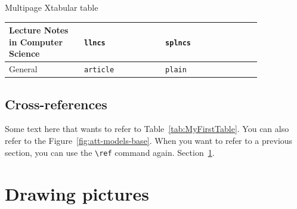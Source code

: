 \documentclass{beamer}
\begin{document}
\begin{frame}{Multipage Xtabular table}
\begin{table}
\begin{xtabular}{
			p{0.25\linewidth}
			p{0.27\linewidth}
			p{0.17\linewidth}
			m{0.15\linewidth}
		}
		Lecture Notes in Computer Science& \Verb|llncs|& \Verb|splncs|&   \\ \midrule
		General & \Verb|article|  & \Verb|plain|  &  \\ 
		
		\bottomrule
	\end{xtabular}
\end{table}
\end{frame}




\begin{frame}
\subsection{Cross-references} 
Some text here that wants to refer to Table~\ref{tab:MyFirstTable}. You can also refer to the Figure~\ref{fig:att-models-base}. When you want to refer to a previous section, you can use the \Verb|\ref| command again. Section~\ref{sec:background}.%

 

\end{frame}






	









\section{Drawing pictures}\label{sec:background}
\end{document}
